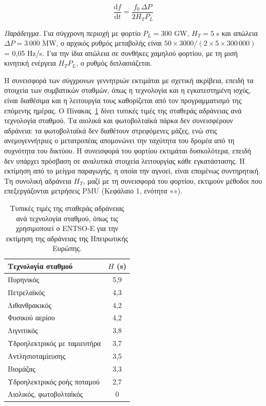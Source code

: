 \begin{equation}
\frac{\mathrm{d}f}{\mathrm{d}t} = \frac{f_0 \, \Delta P}{2 H_T P_L}
\label{eq:rocof}
\end{equation}

\emph{Παράδειγμα.} Για σύγχρονη περιοχή με φορτίο $P_L = 300$ GW, $H_T = 5$ s και απώλεια
$\Delta P = 3\,000$ MW, ο αρχικός ρυθμός μεταβολής είναι
$50 \times 3000 / (2 \times 5 \times 300\,000)$ = 0,05 Hz/s. Για την ίδια απώλεια σε συνθήκες
χαμηλού φορτίου, με τη μισή κινητική ενέργεια $H_T P_L$, ο ρυθμός διπλασιάζεται.

Η συνεισφορά των σύγχρονων γεννητριών εκτιμάται με σχετική ακρίβεια, επειδή τα στοιχεία των
συμβατικών σταθμών, όπως η τεχνολογία και η εγκατεστημένη ισχύς, είναι διαθέσιμα και η
λειτουργία τους καθορίζεται από τον προγραμματισμό της επόμενης ημέρας. Ο
Πίνακας~\ref{tab:hvalues} δίνει τυπικές τιμές της σταθεράς αδράνειας ανά τεχνολογία σταθμού.
Τα αιολικά και φωτοβολταϊκά πάρκα δεν συνεισφέρουν αδράνεια: τα φωτοβολταϊκά δεν διαθέτουν
στρεφόμενες μάζες, ενώ στις ανεμογεννήτριες ο μετατροπέας απομονώνει την ταχύτητα του δρομέα
από τη συχνότητα του δικτύου. Η συνεισφορά του φορτίου εκτιμάται δυσκολότερα, επειδή δεν
υπάρχει πρόσβαση σε αναλυτικά στοιχεία λειτουργίας κάθε εγκατάστασης. Η εκτίμηση από το μείγμα
παραγωγής, η οποία την αγνοεί, είναι επομένως συντηρητική. Τη συνολική αδράνεια $H_T$, μαζί με
τη συνεισφορά του φορτίου, εκτιμούν μέθοδοι που επεξεργάζονται μετρήσεις PMU (Κεφάλαιο 1,
ενότητα «»).

\begin{table}[!htbp]
\centering
\begin{tabular}{lc}
\hline
Τεχνολογία σταθμού & $H$ (s) \\
\hline
Πυρηνικός                    & 5,9 \\
Πετρελαϊκός                  & 4,3 \\
Λιθανθρακικός                & 4,2 \\
Φυσικού αερίου               & 4,2 \\
Λιγνιτικός                   & 3,8 \\
Υδροηλεκτρικός με ταμιευτήρα & 3,7 \\
Αντλησιοταμίευσης            & 3,5 \\
Βιομάζας                     & 3,3 \\
Υδροηλεκτρικός ροής ποταμού  & 2,7 \\
Αιολικός, φωτοβολταϊκός      & 0   \\
\hline
\end{tabular}
\caption{Τυπικές τιμές της σταθεράς αδράνειας ανά τεχνολογία σταθμού, όπως τις χρησιμοποιεί ο
ENTSO-E για την εκτίμηση της αδράνειας της Ηπειρωτικής Ευρώπης.}
\label{tab:hvalues}
\end{table}

